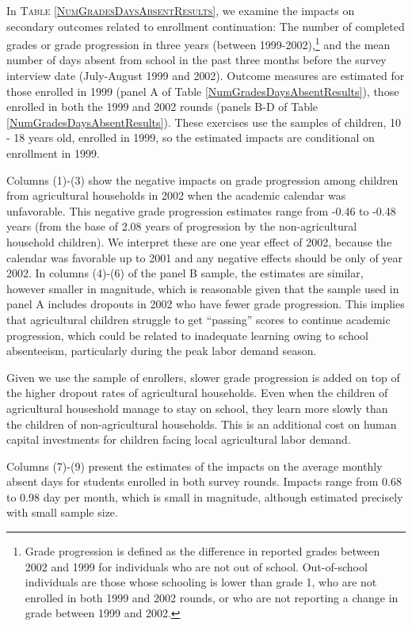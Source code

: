 \documentclass[12pt,letterpaper]{article}
\newcommand{\0}{\ensuremath{\mbox{\boldmath $0$}}}
\begin{document}
In \textsc{\small Table \ref{NumGradesDaysAbsentResults}}, we examine the impacts on secondary outcomes related to enrollment continuation: The number of completed grades or grade progression in three years (between 1999-2002),\footnote{Grade progression is defined as the difference in reported grades between 2002 and 1999 for individuals who are not out of school. Out-of-school individuals are those whose schooling is lower than grade 1, who are not enrolled in both 1999 and 2002 rounds, or who are not reporting a change in grade between 1999 and 2002. } and the mean number of days absent from school in the past three months before the survey interview date (July-August 1999 and 2002). Outcome measures are estimated for those enrolled in 1999 (panel A of Table \ref{NumGradesDaysAbsentResults}), those enrolled in both the 1999 and 2002 rounds (panels B-D of Table \ref{NumGradesDaysAbsentResults}). These exercises use the samples of children, 10 - 18 years old, enrolled in 1999, so the estimated impacts are conditional on enrollment in 1999.

Columns (1)-(3) show the negative impacts on grade progression among children from agricultural households in 2002 when the academic calendar was unfavorable. This negative grade progression estimates range from -0.46 to -0.48 years (from the base of 2.08 years of progression by the non-agricultural household children). We interpret these are one year effect of 2002, because the calendar was favorable up to 2001 and any negative effects should be only of year 2002. 
In columns (4)-(6) of the panel B sample, the estimates are similar, however smaller in magnitude, which is reasonable given that the sample used in panel A includes dropouts in 2002 who have fewer grade progression. This implies that agricultural children struggle to get ``passing'' scores to continue academic progression, which could be related to inadequate learning owing to school absenteeism, particularly during the peak labor demand season. 

Given we use the sample of enrollers, slower grade progression is added on top of the higher dropout rates of agricultural households. Even when the children of agricultural houseshold manage to stay on school, they learn more slowly than the children of non-agricultural households. This is an additional cost on human capital investments for children facing local agricultural labor demand.

Columns (7)-(9) present the estimates of the impacts on the average monthly absent days for students enrolled in both survey rounds. Impacts range from 0.68 to 0.98 day per month, which is small in magnitude, although estimated precisely with small sample size. 
\end{document}

